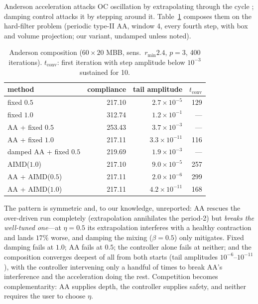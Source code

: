 \documentclass[11pt,a4paper]{article}
\begin{document}
Anderson acceleration attacks OC oscillation by extrapolating through
the cycle \citep{li2020fixedpoint}; damping control attacks it by
stepping around it. Table~\ref{tab:anderson} composes them on the
hard-filter problem (periodic type-II AA, window 4, every fourth step,
with box and volume projection; our variant, undamped unless noted).

\begin{table}[t]
\centering\small
\caption{Anderson composition ($60{\times}20$ MBB, sens.\
$r_{\min}2.4$, $p=3$, 400 iterations). $t_{\mathrm{conv}}$: first
iteration with step amplitude below $10^{-3}$ sustained for 10.}
\label{tab:anderson}
\begin{tabular}{lrrr}
\toprule
method & compliance & tail amplitude & $t_{\mathrm{conv}}$ \\
\midrule
fixed $0.5$        & 217.10 & $2.7\times10^{-5}$ & 129 \\
fixed $1.0$        & 312.74 & $1.2\times10^{-1}$ & --- \\
AA + fixed $0.5$   & 253.43 & $3.7\times10^{-3}$ & --- \\
AA + fixed $1.0$   & 217.11 & $3.3\times10^{-11}$ & 116 \\
damped AA + fixed $0.5$ & 219.69 & $1.9\times10^{-3}$ & --- \\
AIMD($1.0$)        & 217.10 & $9.0\times10^{-5}$ & 257 \\
AA + AIMD($0.5$)   & 217.11 & $2.0\times10^{-6}$ & 299 \\
AA + AIMD($1.0$)   & 217.11 & $4.2\times10^{-11}$ & 168 \\
\bottomrule
\end{tabular}
\end{table}

The pattern is symmetric and, to our knowledge, unreported: AA rescues
the over-driven run completely (extrapolation annihilates the period-2)
but \emph{breaks the well-tuned one}---at $\eta=0.5$ its extrapolation
interferes with a healthy contraction and lands $17\%$ worse, and
damping the mixing ($\beta=0.5$) only mitigates. Fixed damping fails at
$1.0$; AA fails at $0.5$; the controller alone fails at neither; and the
composition converges deepest of all from both starts (tail amplitudes
$10^{-6}$--$10^{-11}$), with the controller intervening only a handful
of times to break AA's interference and the acceleration doing the rest.
Competition becomes complementarity: AA supplies depth, the controller
supplies safety, and neither requires the user to choose $\eta$.
\end{document}
